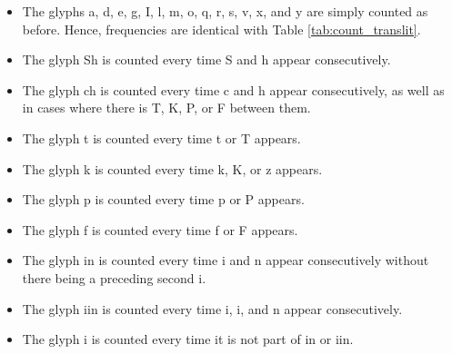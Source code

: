 \documentclass{scrarticle}
\begin{document}
\begin{itemize}
   \item The glyphs {\eva a}, {\eva d}, {\eva e}, {\eva g}, {\eva I}, {\eva l}, {\eva m}, {\eva o}, {\eva q}, {\eva r}, {\eva s}, {\eva v}, {\eva x}, and {\eva y} are simply counted as before. Hence, frequencies are identical with Table \ref{tab:count_translit}.
   \item The glyph {\eva Sh} is counted every time {\eva S} and {\eva h} appear consecutively.
   \item The glyph {\eva ch} is counted every time {\eva c} and {\eva h} appear consecutively, as well as in cases where there is {\eva T}, {\eva K}, {\eva P}, or {\eva F} between them.
   \item The glyph {\eva t} is counted every time {\eva t} or {\eva T} appears.
   \item The glyph {\eva k} is counted every time {\eva k}, {\eva K}, or {\eva z} appears.
   \item The glyph {\eva p} is counted every time {\eva p} or {\eva P} appears.
   \item The glyph {\eva f} is counted every time {\eva f} or {\eva F} appears.
   \item The glyph {\eva in} is counted every time {\eva i} and {\eva n} appear consecutively without there being a preceding second {\eva i}.
   \item The glyph {\eva iin} is counted every time {\eva i}, {\eva i}, and {\eva n} appear consecutively.
   \item The glyph {\eva i} is counted every time it is not part of {\eva in} or {\eva iin}.
\end{itemize}
\end{document}

